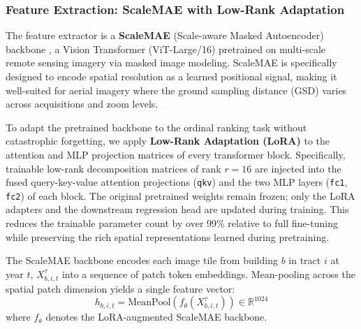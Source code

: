 \documentclass[conference]{IEEEtran}
\begin{document}



\subsubsection{\textbf{Feature Extraction: ScaleMAE with Low-Rank Adaptation}}

The feature extractor is a \textbf{ScaleMAE} (Scale-aware Masked Autoencoder) backbone \citep{reed2023scalemae}, a Vision Transformer (ViT-Large/16) pretrained on multi-scale remote sensing imagery via masked image modeling. ScaleMAE is specifically designed to encode spatial resolution as a learned positional signal, making it well-suited for aerial imagery where the ground sampling distance (GSD) varies across acquisitions and zoom levels.

To adapt the pretrained backbone to the ordinal ranking task without catastrophic forgetting, we apply \textbf{Low-Rank Adaptation (LoRA)} \citep{hu2021lora} to the attention and MLP projection matrices of every transformer block. Specifically, trainable low-rank decomposition matrices of rank $r = 16$ are injected into the fused query-key-value attention projections (\texttt{qkv}) and the two MLP layers (\texttt{fc1}, \texttt{fc2}) of each block. The original pretrained weights remain frozen; only the LoRA adapters and the downstream regression head are updated during training. This reduces the trainable parameter count by over 99\% relative to full fine-tuning while preserving the rich spatial representations learned during pretraining.

The ScaleMAE backbone encodes each image tile from building $b$ in tract $i$ at year $t$, $X_{b,i,t}^\tau$ into a sequence of patch token embeddings. Mean-pooling across the spatial patch dimension yields a single feature vector:
\begin{equation}
h_{b,i,t} = \text{MeanPool}\!\left( f_\theta\!\left(X_{b,i,t}^\tau\right) \right) \in \mathbb{R}^{1024}
\end{equation}
where $f_\theta$ denotes the LoRA-augmented ScaleMAE backbone.
\end{document}
